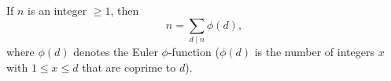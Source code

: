 If $n$ is an integer $\geq 1$, then
$$n = \sum_{d \mid n} \phi(d),$$
where $\phi(d)$ denotes the Euler $\phi$-function ($\phi(d)$ is the number of integers $x$ with $1 \leq x \leq d$ that are coprime to $d$).
